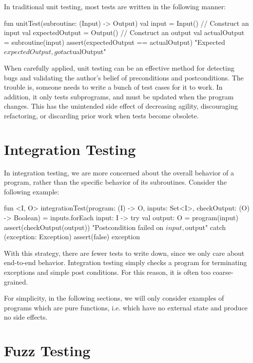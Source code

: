 \documentclass[12pt,initial,twoside,maitrise]{dms}
\numberwithin{equation}{section}
\numberwithin{table}{chapter}
\numberwithin{figure}{chapter}
\begin{document}
\noindent In traditional unit testing, most tests are written in the following manner:
%
\begin{kotlinlisting}
fun unitTest(subroutine: (Input) -> Output) {
    val input = Input() // Construct an input
    val expectedOutput = Output() // Construct an output
    val actualOutput = subroutine(input)
    assert(expectedOutput == actualOutput) { "Expected $expectedOutput, got $actualOutput"}
}
\end{kotlinlisting}
%
When carefully applied, unit testing can be an effective method for detecting bugs and validating the author's belief of preconditions and postconditions. The trouble is, someone needs to write a bunch of test cases for it to work. In addition, it only tests subprograms, and must be updated when the program changes. This has the unintended side effect of decreasing agility, discouraging refactoring, or discarding prior work when tests become obsolete.

\section{Integration Testing}

\noindent In integration testing, we are more concerned about the overall behavior of a program, rather than the specific behavior of its subroutines. Consider the following example:

\begin{kotlinlisting}
fun <I, O> integrationTest(program: (I) -> O, inputs: Set<I>, checkOutput: (O) -> Boolean) =
    inputs.forEach { input: I ->
        try {
            val output: O = program(input)
            assert(checkOutput(output)) { "Postcondition failed on $input, $output" }
        } catch (exception: Exception) {
            assert(false) { exception }
        }
    }
\end{kotlinlisting}
%
With this strategy, there are fewer tests to write down, since we only care about end-to-end behavior. Integration testing simply checks a program for terminating exceptions and simple post conditions. For this reason, it is often too coarse-grained.

For simplicity, in the following sections, we will only consider examples of programs which are pure functions, i.e. which have no external state and produce no side effects.

\section{Fuzz Testing}
\end{document}
